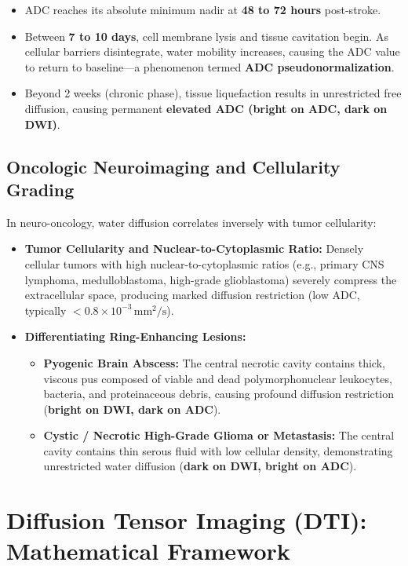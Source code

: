\documentclass[11pt,a4paper]{article}
\begin{document}
\begin{enumerate}[leftmargin=*]
\begin{itemize}
        \item ADC reaches its absolute minimum nadir at \textbf{48 to 72 hours} post-stroke.
        \item Between \textbf{7 to 10 days}, cell membrane lysis and tissue cavitation begin. As cellular barriers disintegrate, water mobility increases, causing the ADC value to return to baseline—a phenomenon termed \textbf{ADC pseudonormalization}.
        \item Beyond 2 weeks (chronic phase), tissue liquefaction results in unrestricted free diffusion, causing permanent \textbf{elevated ADC (bright on ADC, dark on DWI)}.
    \end{itemize}
\end{enumerate}

\subsection{Oncologic Neuroimaging and Cellularity Grading}

In neuro-oncology, water diffusion correlates inversely with tumor cellularity:
\begin{itemize}[leftmargin=*]
    \item \textbf{Tumor Cellularity and Nuclear-to-Cytoplasmic Ratio:} Densely cellular tumors with high nuclear-to-cytoplasmic ratios (e.g., primary CNS lymphoma, medulloblastoma, high-grade glioblastoma) severely compress the extracellular space, producing marked diffusion restriction (low ADC, typically $< 0.8 \times 10^{-3}\,\text{mm}^2/\text{s}$).
    \item \textbf{Differentiating Ring-Enhancing Lesions:}
    \begin{itemize}
        \item \textbf{Pyogenic Brain Abscess:} The central necrotic cavity contains thick, viscous pus composed of viable and dead polymorphonuclear leukocytes, bacteria, and proteinaceous debris, causing profound diffusion restriction (\textbf{bright on DWI, dark on ADC}).
        \item \textbf{Cystic / Necrotic High-Grade Glioma or Metastasis:} The central cavity contains thin serous fluid with low cellular density, demonstrating unrestricted water diffusion (\textbf{dark on DWI, bright on ADC}).
    \end{itemize}
\end{itemize}

\newpage
\section{Diffusion Tensor Imaging (DTI): Mathematical Framework}
\end{document}
